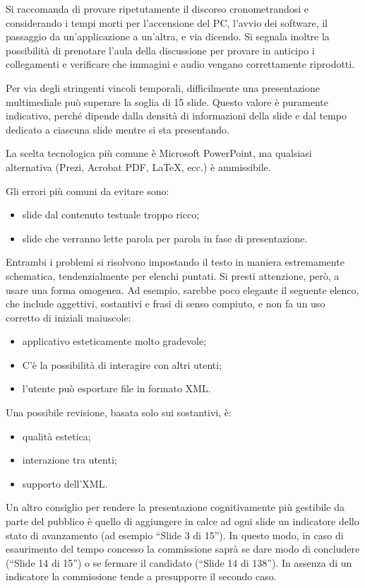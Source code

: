 \documentclass[12pt]{report}
\begin{document}
Si raccomanda di provare ripetutamente il discorso cronometrandosi e considerando i tempi morti per l'accensione del PC, l'avvio dei software, il passaggio da un'applicazione a un'altra, e via dicendo. Si segnala inoltre la possibilità di prenotare l'aula della discussione per provare in anticipo i collegamenti e verificare che immagini e audio vengano correttamente riprodotti.

Per via degli stringenti vincoli temporali, difficilmente una presentazione multimediale può superare la soglia di 15 slide. Questo valore è puramente indicativo, perché dipende dalla densità di informazioni della slide e dal tempo dedicato a ciascuna slide mentre si sta presentando.

La scelta tecnologica più comune è Microsoft PowerPoint, ma qualsiasi alternativa (Prezi, Acrobat PDF, \LaTeX, ecc.) è ammissibile. 

Gli errori più comuni da evitare sono:
\begin{itemize}
	\item slide dal contenuto testuale troppo ricco;
	\item slide che verranno lette parola per parola in fase di presentazione.
\end{itemize}

Entrambi i problemi si risolvono impostando il testo in maniera estremamente schematica, tendenzialmente per elenchi puntati. Si presti attenzione, però, a usare una forma omogenea. 
Ad esempio, sarebbe poco elegante il seguente elenco, che include aggettivi, sostantivi e frasi di senso compiuto, e non fa un uso corretto di iniziali maiuscole:
\begin{itemize}
	\item applicativo esteticamente molto gradevole;
	\item C'è la possibilità di interagire con altri utenti;
	\item l'utente può esportare file in formato XML.
\end{itemize}

Una possibile revisione, basata solo sui sostantivi, è: 
\begin{itemize}
	\item qualità estetica;
	\item interazione tra utenti;
	\item supporto dell'XML.
\end{itemize}

Un altro consiglio per rendere la presentazione cognitivamente più gestibile da parte del pubblico è quello di aggiungere in calce ad ogni slide un indicatore dello stato di avanzamento (ad esempio ``Slide 3 di 15''). In questo modo, in caso di esaurimento del tempo concesso la commissione saprà se dare modo di concludere (``Slide 14 di 15'') o se fermare il candidato (``Slide 14 di 138''). In assenza di un indicatore la commissione tende a presupporre il secondo caso.
\end{document}
